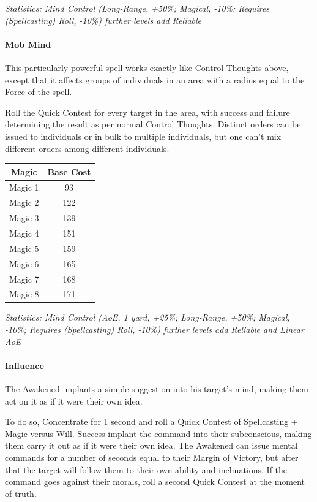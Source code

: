 \begin{multicols*}{3}
	\textcolor{OliveGreen}{\textit{Statistics: Mind Control (Long-Range, +50\%; Magical, -10\%; Requires (Spellcasting) Roll, -10\%) further levels add Reliable}}
	
	\paragraph{Mob Mind}
	
	This particularly powerful spell works exactly like Control Thoughts above, except that it affects groups of individuals in an area with a radius equal to the Force of the spell.
	
	Roll the Quick Contest for every target in the area, with success and failure determining the result as per normal Control Thoughts. Distinct orders can be issued to individuals or in bulk to multiple individuals, but one can't mix different orders among different individuals.
	
	\begin{center}
		\begin{tabular}{|c|c|}
			\hline
			Magic & Base Cost \\
			\hline
			\hline
			Magic 1 & 93 \\
			Magic 2 & 122 \\
			Magic 3 & 139 \\
			Magic 4 & 151 \\
			Magic 5 & 159 \\
			Magic 6 & 165 \\
			Magic 7 & 168 \\
			Magic 8 & 171 \\
			\hline
		\end{tabular}
	\end{center}	

	\textcolor{OliveGreen}{\textit{Statistics: Mind Control (AoE, 1 yard, +25\%; Long-Range, +50\%; Magical, -10\%; Requires (Spellcasting) Roll, -10\%) further levels add Reliable and Linear AoE}}
	
	\paragraph{Influence}
	
	The Awakened implants a simple suggestion into his target's mind, making them act on it as if it were their own idea.
	
	To do so, Concentrate for 1 second and roll a Quick Contest of Spellcasting + Magic versus Will. Success implant the command into their subconscious, making them carry it out as if it were their own idea. The Awakened can issue mental commands for a number of seconds equal to their Margin of Victory, but after that the target will follow them to their own ability and inclinations. If the command goes against their morals, roll a second Quick Contest at the moment of truth.
	

\end{multicols*}
